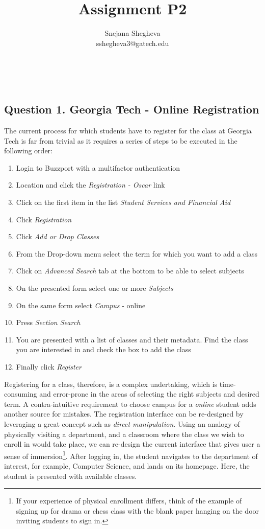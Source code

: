 \documentclass[12pt,letterpaper]{article}
\makeatletter
\renewcommand{\maketitle}{\bgroup
   \begin{center}
   \textbf{{\fontsize{18pt}{20}\selectfont \@title}}\\
   \vspace{10pt}
   {\fontsize{12pt}{0}\selectfont \@author} 
   \end{center}
}
\makeatother
\begin{document}
\title{Assignment P2}
\author{Snejana Shegheva \\ sshegheva3@gatech.edu}

\maketitle
\thispagestyle{fancy}

\subsection*{Question 1. Georgia Tech - Online Registration}
The current process for which students have to register for the class at Georgia Tech is far from trivial as it requires a series of steps to be executed in the following order:

\begin{enumerate}
    \item Login to Buzzport with a multifactor authentication
    \item Location and click the \textit{Registration - Oscar} link 
    \item Click on the first item in the list \textit{Student Services and Financial Aid}
    \item Click \textit{Registration}
    \item Click \textit{Add or Drop Classes}
    \item From the Drop-down menu select the term for which you want to add a class
    \item Click on \textit{Advanced Search} tab at the bottom to be able to select subjects
    \item On the presented form select one or more \textit{Subjects}
    \item On the same form select \textit{Campus} - online
    \item Press \textit{Section Search}
    \item You are presented with a list of classes and their metadata. Find the class you are interested in and check the box to add the class
    \item Finally click \textit{Register}
\end{enumerate}

Registering for a class, therefore, is a complex undertaking, which is time-consuming and error-prone in the areas of selecting the right subjects and desired term. A contra-intuitive requirement to choose campus for a \textit{online} student adds another source for mistakes.
The registration interface can be re-designed by leveraging a great concept such as \textit{direct manipulation}. Using an analogy of physically visiting a department, and a classroom where the class we wish to enroll in would take place, we can re-design the current interface that gives user a sense of immersion\footnote{If your experience of physical enrollment differs, think of the example of signing up for drama or chess class with the blank paper hanging on the door inviting students to sign in.}. After logging in, the student navigates to the department of interest, for example, Computer Science, and lands on its homepage. Here, the student is presented with available classes.
\end{document}
